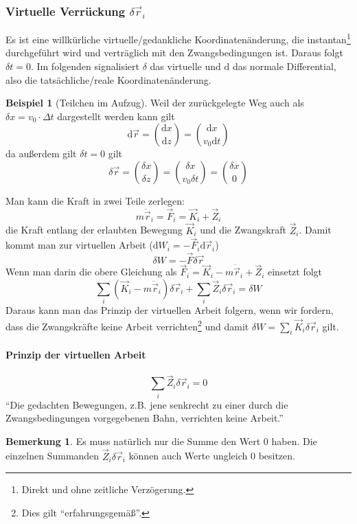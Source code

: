 \documentclass[oneside]{book}
\theoremstyle{definition}
\newtheorem*{bemerkung*}{Bemerkung}
\newtheorem*{beispiel*}{Beispiel}
\newcommand{\conseq}{$\rightarrow$~}
\renewcommand{\d}{\mathrm d}
\newcommand{\rvec}{\vec{r}}
\newcommand{\ddotvec}[1]{\ddot{\vec{#1}}}
\begin{document}

\subsubsection{Virtuelle Verrückung $\delta \vec{r}_i$} Es ist eine willkürliche virtuelle/gedankliche Koordinatenänderung, die instantan\footnote{Direkt und ohne zeitliche Verzögerung.} durchgeführt wird und verträglich mit den Zwangsbedingungen ist. Daraus folgt $\delta t = 0$. Im folgenden signalisiert $\delta$ das virtuelle und $\d$ das normale Differential, also die tatsächliche/reale Koordinatenänderung.

\begin{beispiel*}[Teilchen im Aufzug]
Weil der zurückgelegte Weg auch als $\delta x = v_0 \cdot \Delta t$ dargestellt werden kann gilt
$$\d \vec{r} = \binom{\d x}{\d z} = \binom{\d x}{ v_0 \d t}$$
da außerdem gilt $\delta t = 0$ gilt
$$\delta \vec{r} = \binom{\delta x}{\delta z} = \binom{\delta x}{v_0 \delta t} = \binom{\delta x}{0}$$
\end{beispiel*}
Man kann die Kraft in zwei Teile zerlegen:
$$m \ddotvec{r}_i = \vec{F}_i = \vec{K}_i + \vec{Z}_i$$
die Kraft entlang der erlaubten Bewegung $\vec{K}_i$ und die Zwangskraft $\vec{Z}_i$. Damit kommt man zur virtuellen Arbeit ($\d W_i = - \vec{F}_i \d \vec{r}_i$)
$$\delta W = - \vec{F} \delta \vec{r}$$
Wenn man darin die obere Gleichung als $\vec{F}_i = \vec{K}_i - m \ddotvec{r}_i + \vec{Z}_i$ einsetzt folgt
$$\sum_i (\vec{K}_i - m \ddot{\vec{r}}_i) \delta \vec{r}_i + \sum_i \vec{Z}_i \delta \vec{r}_i = \delta W$$
Daraus kann man das Prinzip der virtuellen Arbeit folgern, wenn wir fordern, dass die Zwangskräfte keine Arbeit verrichten\footnote{Dies gilt "`erfahrungsgemäß"'.} und damit $\delta W = \sum_i \vec{K}_i \delta \rvec_i$ gilt.

\paragraph{Prinzip der virtuellen Arbeit}
$$\sum_i \vec{Z}_i \delta \vec{r}_i = 0$$
"`Die gedachten Bewegungen, z.B. jene senkrecht zu einer durch die Zwangsbedingungen vorgegebenen Bahn, verrichten keine Arbeit."'

\begin{bemerkung*}
	Es muss natürlich nur die Summe den Wert 0 haben. Die einzelnen Summanden $\vec{Z}_i \delta \rvec_i$ können auch Werte ungleich 0 besitzen.
\end{bemerkung*}
\end{document}
